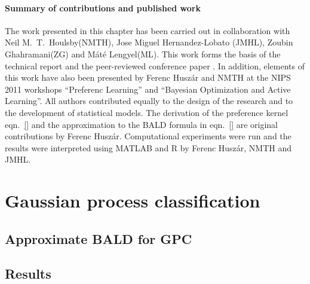 
\paragraph{Summary of contributions and published work} The work presented in this chapter has been carried out in collaboration with Neil M.\ T.\ Houlsby(NMTH), Jose Miguel Hernandez-Lobato (JMHL), Zoubin Ghahramani(ZG) and M\'{a}t\'{e} Lengyel(ML). This work forms the basis of the technical report \citep{arxivBALD} and the peer-reviewed conference paper \citep{NIPS2012}. In addition, elements of this work have also been presented by Ferenc Husz\'{a}r and NMTH at the NIPS 2011 workshops ``Preferenc Learning'' and ``Bayesian Optimization and Active Learning''. All authors contributed equally to the design of the research and to the development of statistical models. The derivation of the preference kernel eqn.\ \eqref{} and the approximation to the BALD formula in eqn.\ \eqref{} are original contributions by Ferenc Husz\'{a}r. Computational experiments were run and the results were interpreted using MATLAB and R by Ferenc Husz\'{a}r, NMTH and JMHL.


\section{Gaussian process classification}

\subsection{Approximate BALD for GPC}


\subsection{Results}

